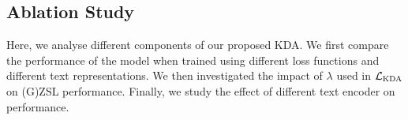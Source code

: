 \documentclass[10pt,twocolumn,letterpaper]{article}
\begin{document}
\begin{table*}[t]
    \centering
    \caption{Ablation study on KDA. The mean class accuracy for GZSL is reported on the seen (S) and unseen (U) test classes, and their harmonic mean (HM). For the ZSL performance, only the test subset of unseen classes is considered.}
    \label{ablation}
\end{table*}


\subsection{Ablation Study}
Here, we analyse different components of our proposed KDA. We first compare the performance of the model when trained using different loss functions and different text representations. We then investigated the impact of $\lambda$ used in $\mathcal{L}_{\rm KDA}$ on (G)ZSL performance. Finally, we study the effect of different text encoder on performance.
\end{document}
